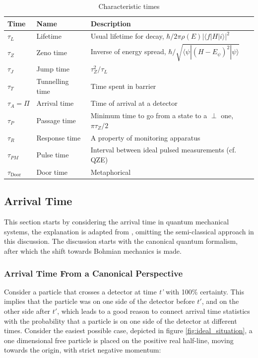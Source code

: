 \begin{table}[t] %
\centering
\caption{Characteristic times}
\begin{tabular}{lll}
\hline
\textbf{Time} & \textbf{Name} & \textbf{Description} \\
\hline
\label{tbl:characteristic_times}
$\tau_L$ & Lifetime & Usual lifetime for decay, $\hbar/2\pi\rho(E)|\langle f|H|i\rangle|^2$ \\
$\tau_Z$ & Zeno time & Inverse of energy spread, $\hbar/\sqrt{\langle \psi | (H - E_\psi)^2 | \psi \rangle}$ \\
$\tau_J$ & Jump time & $\tau_Z^2/\tau_L$ \\
$\tau_T$ & Tunnelling time & Time spent in barrier \\
$\tau_A = \Pi$ & Arrival time & Time of arrival at a detector \\
$\tau_P$ & Passage time & Minimum time to go from a state to a $\perp$ one, $\pi\tau_Z/2$ \\
$\tau_R$ & Response time & A property of monitoring apparatus \\
$\tau_{PM}$ & Pulse time & Interval between ideal pulsed measurements (cf. QZE) \\
$\tau_{\text{Door}}$ & Door time & Metaphorical \\
\hline
\end{tabular}
\end{table}

\subsection{Arrival Time}
\label{ap:arrivaltime}

This section starts by considering the arrival time in quantum mechanical systems, the explanation is adapted from \cite{paper:probability_current}, omitting the semi-classical approach in this discussion. The discussion starts with the canonical quantum formalism, after which the shift towards Bohmian mechanics is made.

\subsubsection{Arrival Time From a Canonical Perspective}

Consider a particle that crosses a detector at time \textit{t'} with 100\% certainty. This implies that the particle was on one side of the detector before $t'$, and on the other side after $t'$, which leads to a good reason to connect arrival time statistics with the probability that a particle is on one side of the detector at different times. Consider the easiest possible case, depicted in figure \ref{fig:ideal_situation}, a one dimensional free particle is placed on the positive real half-line, moving towards the origin, with strict negative momentum:

